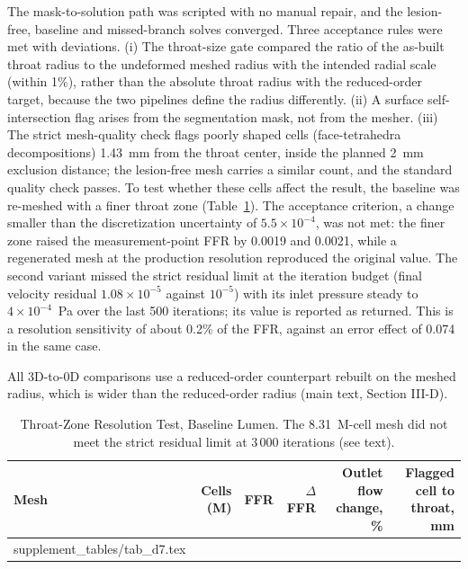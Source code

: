 \documentclass[journal,twoside,web,onecolumn]{ieeecolor}
\begin{document}
The mask-to-solution path was scripted with no manual repair, and the lesion-free, baseline and missed-branch solves
converged. Three acceptance rules were met with deviations. (i) The throat-size gate compared the ratio of the
as-built throat radius to the undeformed meshed radius with the intended radial scale (within 1\%), rather than the
absolute throat radius with the reduced-order target, because the two pipelines define the radius differently. (ii) A surface self-intersection flag arises from the segmentation mask, not from the mesher. (iii) The
strict mesh-quality check flags poorly shaped cells (face-tetrahedra decompositions) 1.43~mm from the throat center,
inside the planned 2~mm exclusion distance; the lesion-free mesh carries a similar count, and the standard quality
check passes. To test whether these cells affect the result, the baseline was re-meshed with a finer throat zone
(Table~\ref{tab:d7}). The acceptance criterion, a change smaller than the discretization uncertainty of
$5.5\times10^{-4}$, was not met: the finer zone raised the measurement-point FFR by 0.0019 and 0.0021, while a
regenerated mesh at the production resolution reproduced the original value. The second variant missed the strict
residual limit at the iteration budget (final velocity residual $1.08\times10^{-5}$ against $10^{-5}$) with its inlet
pressure steady to $4\times10^{-4}$~Pa over the last 500 iterations; its value is reported as returned. This is a resolution sensitivity of
about 0.2\% of the FFR, against an error effect of 0.074 in the same case.

All 3D-to-0D comparisons use a reduced-order counterpart rebuilt on the meshed radius, which is wider than the
reduced-order radius (main text, Section III-D).
\begin{table}[!ht]
\caption{Throat-Zone Resolution Test, Baseline Lumen. The 8.31~M-cell mesh did not meet the strict residual limit at
3\,000 iterations (see text).}\label{tab:d7}
\centering\small
\begin{tabular}{@{}lrrrrr@{}}
\toprule
Mesh & Cells (M) & FFR & $\Delta$FFR & Outlet flow change, \% & Flagged cell to throat, mm\\
\midrule
{} supplement_tables/tab_d7.tex 
\bottomrule
\end{tabular}
\end{table}
\end{document}
